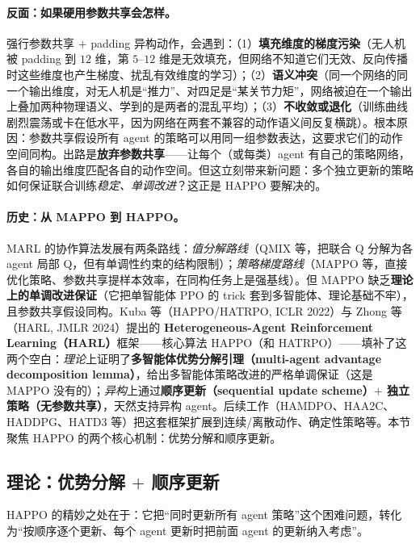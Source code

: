 \paragraph{反面：如果硬用参数共享会怎样。}
强行参数共享 $+$ padding 异构动作，会遇到：（1）\textbf{填充维度的梯度污染}（无人机被 padding 到 $12$ 维，第 $5$--$12$ 维是无效填充，但网络不知道它们无效、反向传播时这些维度也产生梯度、扰乱有效维度的学习）；（2）\textbf{语义冲突}（同一个网络的同一个输出维度，对无人机是“推力”、对四足是“某关节力矩”，网络被迫在一个输出上叠加两种物理语义、学到的是两者的混乱平均）；（3）\textbf{不收敛或退化}（训练曲线剧烈震荡或卡在低水平，因为网络在两套不兼容的动作语义间反复横跳）。根本原因：参数共享假设所有 agent 的策略可以用同一组参数表达，这要求它们的动作空间同构。出路是\textbf{放弃参数共享}——让每个（或每类）agent 有自己的策略网络，各自的输出维度匹配各自的动作空间。但这立刻带来新问题：多个独立更新的策略如何保证联合训练\emph{稳定、单调改进}？这正是 HAPPO 要解决的。

\paragraph{历史：从 MAPPO 到 HAPPO。}
MARL 的协作算法发展有两条路线：\emph{值分解路线}（QMIX 等，把联合 Q 分解为各 agent 局部 Q，但有单调性约束的结构限制）；\emph{策略梯度路线}（MAPPO 等，直接优化策略、参数共享提样本效率，在同构任务上是强基线）。但 MAPPO 缺乏\textbf{理论上的单调改进保证}（它把单智能体 PPO 的 trick 套到多智能体、理论基础不牢），且参数共享假设同构。Kuba 等（HAPPO/HATRPO, ICLR 2022\cite{kuba2022happo}）与 Zhong 等（HARL, JMLR 2024\cite{zhong2024harl}）提出的 \textbf{Heterogeneous-Agent Reinforcement Learning（HARL）}框架——核心算法 HAPPO（和 HATRPO）——填补了这两个空白：\emph{理论}上证明了\textbf{多智能体优势分解引理（multi-agent advantage decomposition lemma）}，给出多智能体策略改进的严格单调保证（这是 MAPPO 没有的）；\emph{异构}上通过\textbf{顺序更新（sequential update scheme）$+$ 独立策略（无参数共享）}，天然支持异构 agent。后续工作（HAMDPO、HAA2C、HADDPG、HATD3 等）把这套框架扩展到连续/离散动作、确定性策略等。本节聚焦 HAPPO 的两个核心机制：优势分解和顺序更新。

\subsection{理论：优势分解 $+$ 顺序更新}
\label{sec:hmr-marl-theory}
HAPPO 的精妙之处在于：它把“同时更新所有 agent 策略”这个困难问题，转化为“按顺序逐个更新、每个 agent 更新时把前面 agent 的更新纳入考虑”。

